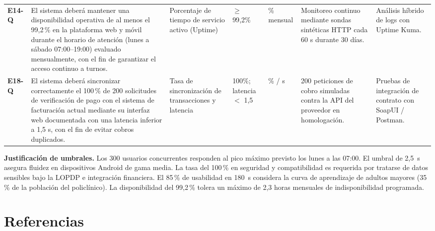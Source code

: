 \documentclass[conference]{IEEEtran}
\begin{document}
\begin{center}
\begin{tabular}{@{}p{0.7cm}p{5.1cm}p{2.3cm}p{1.4cm}p{0.8cm}p{2.8cm}p{2.8cm}@{}}
\addlinespace[3pt]
\textbf{E14-Q} & El sistema deber\'a mantener una disponibilidad operativa de al menos el 99,2\,\% en la plataforma web y m\'ovil durante el horario de atenci\'on (lunes a s\'abado 07:00--19:00) evaluado mensualmente, con el fin de garantizar el acceso continuo a turnos. & Porcentaje de tiempo de servicio activo (Uptime) & $\ge$ 99{,}2\% & \% mensual & Monitoreo continuo mediante sondas sint\'eticas HTTP cada 60 s durante 30 d\'ias. & An\'alisis h\'ibrido de logs con Uptime Kuma.\\
\addlinespace[3pt]
\textbf{E18-Q} & El sistema deber\'a sincronizar correctamente el 100\,\% de 200 solicitudes de verificaci\'on de pago con el sistema de facturaci\'on actual mediante su interfaz web documentada con una latencia inferior a 1,5 s, con el fin de evitar cobros duplicados. & Tasa de sincronizaci\'on de transacciones y latencia & 100\%; latencia $<$ 1{,}5 & \% / s & 200 peticiones de cobro simuladas contra la API del proveedor en homologaci\'on. & Pruebas de integraci\'on de contrato con SoapUI / Postman.\\
\bottomrule
\end{tabular}
\end{center}
\vspace{0.25cm}

\noindent\textbf{Justificaci\'on de umbrales.} Los 300 usuarios concurrentes responden al pico m\'aximo previsto los lunes a las 07:00. El umbral de 2,5~s asegura fluidez en dispositivos Android de gama media. La tasa del 100\,\% en seguridad y compatibilidad es requerida por tratarse de datos sensibles bajo la LOPDP \cite{lopdp2021} e integraci\'on financiera. El 85\,\% de usabilidad en 180~s considera la curva de aprendizaje de adultos mayores (35\,\% de la poblaci\'on del policl\'inico). La disponibilidad del 99,2\,\% tolera un m\'aximo de 2,3 horas mensuales de indisponibilidad programada.

\section{Referencias}
\printbibliography[heading=none]
\end{document}

